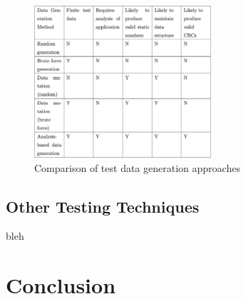 \documentclass[10pt, final, journal, letterpaper, twoside, twocolumn]{IEEEtran}
\begin{document}
	\begin{figure}[ht!]
		\centering
		\includegraphics[width=2.585in]{Sources/testdata}
		\caption{Comparison of test data generation approaches}
		\label{fig:testdata}
	\end{figure}
	
	\subsection{Other Testing Techniques}
		bleh

\section{\label{sec:conclude}Conclusion}
	
	
\clearpage


\end{document}
